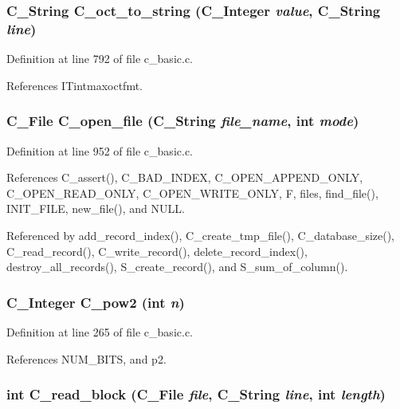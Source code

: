 \subsubsection{\setlength{\rightskip}{0pt plus 5cm}\bf{C\_\-String} C\_\-oct\_\-to\_\-string (\bf{C\_\-Integer} {\em value}, \bf{C\_\-String} {\em line})}\label{c__basic_8c_5e082b6a1450e164f089e10f5fa3259b}




Definition at line 792 of file c\_\-basic.c.

References ITintmaxoctfmt.
\subsubsection{\setlength{\rightskip}{0pt plus 5cm}\bf{C\_\-File} C\_\-open\_\-file (\bf{C\_\-String} {\em file\_\-name}, int {\em mode})}\label{c__basic_8c_2367fe0e4da092c7cde37a0c323d30a1}




Definition at line 952 of file c\_\-basic.c.

References C\_\-assert(), C\_\-BAD\_\-INDEX, C\_\-OPEN\_\-APPEND\_\-ONLY, C\_\-OPEN\_\-READ\_\-ONLY, C\_\-OPEN\_\-WRITE\_\-ONLY, F, files, find\_\-file(), INIT\_\-FILE, new\_\-file(), and NULL.

Referenced by add\_\-record\_\-index(), C\_\-create\_\-tmp\_\-file(), C\_\-database\_\-size(), C\_\-read\_\-record(), C\_\-write\_\-record(), delete\_\-record\_\-index(), destroy\_\-all\_\-records(), S\_\-create\_\-record(), and S\_\-sum\_\-of\_\-column().
\subsubsection{\setlength{\rightskip}{0pt plus 5cm}\bf{C\_\-Integer} C\_\-pow2 (int {\em n})}\label{c__basic_8c_5a88e5380ebfbea2c8fa7c59866c422b}




Definition at line 265 of file c\_\-basic.c.

References NUM\_\-BITS, and p2.
\subsubsection{\setlength{\rightskip}{0pt plus 5cm}int C\_\-read\_\-block (\bf{C\_\-File} {\em file}, \bf{C\_\-String} {\em line}, int {\em length})}\label{c__basic_8c_6d27dd666bd57789ada8449dd1689237}




